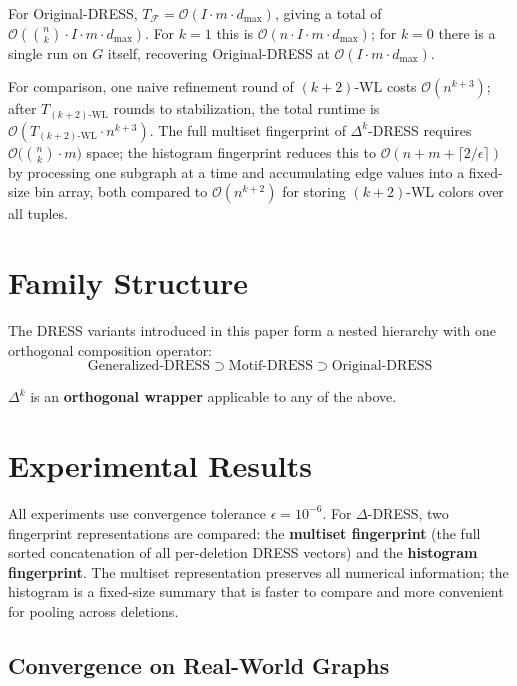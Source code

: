 \documentclass[11pt,a4paper]{article}
\begin{document}
For Original-DRESS, $T_{\mathcal{F}} = \mathcal{O}(I \cdot m \cdot d_{\max})$, giving a total of $\mathcal{O}\!\left(\binom{n}{k} \cdot I \cdot m \cdot d_{\max}\right)$. For $k = 1$ this is $\mathcal{O}(n \cdot I \cdot m \cdot d_{\max})$; for $k = 0$ there is a single run on $G$ itself, recovering Original-DRESS at $\mathcal{O}(I \cdot m \cdot d_{\max})$.

For comparison, one naive refinement round of $(k{+}2)$-WL costs $\mathcal{O}(n^{k+3})$; after $T_{(k+2)\text{-WL}}$ rounds to stabilization, the total runtime is $\mathcal{O}\!\left(T_{(k+2)\text{-WL}} \cdot n^{k+3}\right)$. The full multiset fingerprint of $\Delta^k$-DRESS requires $\mathcal{O}\!\bigl(\binom{n}{k} \cdot m\bigr)$ space; the histogram fingerprint reduces this to $\mathcal{O}(n + m + \lceil 2/\epsilon \rceil)$ by processing one subgraph at a time and accumulating edge values into a fixed-size bin array, both compared to $\mathcal{O}(n^{k+2})$ for storing $(k{+}2)$-WL colors over all tuples.

\section{Family Structure}
The DRESS variants introduced in this paper form a nested hierarchy with one orthogonal composition operator:
\[
\text{Generalized-DRESS} \supset \text{Motif-DRESS} \supset \text{Original-DRESS}
\]

$\Delta^k$ is an \textbf{orthogonal wrapper} applicable to any of the above.

\section{Experimental Results}

All experiments use convergence tolerance $\epsilon = 10^{-6}$. For $\Delta$-DRESS, two fingerprint representations are compared: the \textbf{multiset fingerprint} (the full sorted concatenation of all per-deletion DRESS vectors) and the \textbf{histogram fingerprint}. The multiset representation preserves all numerical information; the histogram is a fixed-size summary that is faster to compare and more convenient for pooling across deletions.

\subsection{Convergence on Real-World Graphs}
\label{sec:convergence-empirical}
\end{document}
